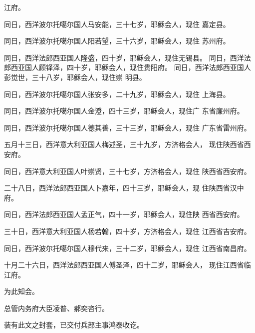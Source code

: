 江府。%
\par
同日，西洋波尔托噶尔国人马安能，三十七岁，耶稣会人，现住%
嘉定县。%
\par
同日，西洋波尔托噶尔国人阳若望，三十六岁，耶稣会人，现住%
苏州府。%
\par
同日，西洋法郎西亚国人隆盛，四十岁，耶稣会人，现住无锡县。%
同日，西洋法郎西亚国人顾铎泽，四十岁，耶稣会人，现住贵阳府。%
同日，西洋法郎西亚国人彭觉世，三十八岁，耶稣会人，现住崇%
明县。%
\par
同日，西洋波尔托噶尔国人张安多，二十九岁，耶稣会人，现住%
上海县。%
\par
同日，西洋波尔托噶尔国人金澄，四十三岁，耶稣会人，现住广%
东省廉州府。%
\par
同日，西洋波尔托噶尔国人德其善，三十三岁，耶稣会人，现住%
广东省雷州府。%
\par
五月十三日，西洋意大利亚国人梅述圣，三十九岁，方济格会人，%
现住陕西省西安府。%
\par
同日，西洋意大利亚国人叶崇贤，三十七岁，方济格会人，现住%
陕西省西安府。%
\par
二十八日，西洋法郎西亚国人卜嘉年，四十三岁，耶稣会人，现%
住陕西省汉中府。%
\par
同日，西洋法郎西亚国人孟正气，四十一岁，耶稣会人，现住陕%
西省西安府。%
\par
三十日，西洋意大利亚国人杨若翰，四十岁，方济格会人，现住%
江西省吉安府。%
\par
同日，西洋波尔托噶尔国人穆代来，三十二岁，耶稣会人，现住%
江西省南昌府。%
\par
十月二十六日，西洋法郎西亚国人傅圣泽，四十二岁，耶稣会人，%
现住江西省临江府。%
\par
为此知会。%
\par
总管内务府大臣凌普、郝奕咨行。%
\par
装有此文之封套，已交付兵部主事鸿泰收讫。%
